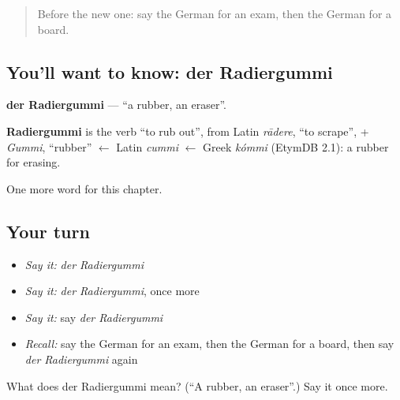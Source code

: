 \label{lesson:GE-C127-radiergummi}



\begin{quote}
Before the new one: say the German for an exam, then the German for a board.
\end{quote}

\subsection*{You'll want to know: der Radiergummi}
\textbf{der Radiergummi} — \textquotedblleft{}a rubber, an eraser\textquotedblright{}.

\begin{cousinweb}
\textbf{Radiergummi} is the verb \textquotedblleft{}to rub out\textquotedblright{}, from Latin \emph{rādere}, \textquotedblleft{}to scrape\textquotedblright{}, + \emph{Gummi}, \textquotedblleft{}rubber\textquotedblright{} $\leftarrow$ Latin \emph{cummi} $\leftarrow$ Greek \emph{kómmi} (EtymDB 2.1): a rubber for erasing.
\end{cousinweb}

\begin{grammarlens}[title={What you've built}]
One more word for this chapter.
\end{grammarlens}

\subsection*{Your turn}
\begin{itemize}
\raggedright
  \item \emph{Say it:} \emph{der Radiergummi}
  \item \emph{Say it:} \emph{der Radiergummi}, once more
  \item \emph{Say it:} say \emph{der Radiergummi}
  \item \emph{Recall:} say the German for an exam, then the German for a board, then say \emph{der Radiergummi} again
\end{itemize}

\begin{tcolorbox}[breakable,colback=teal!4,colframe=teal!35!black,title={Before you move on}]
What does der Radiergummi mean? (\textquotedblleft{}A rubber, an eraser\textquotedblright{}.) Say it once more.
\end{tcolorbox}
